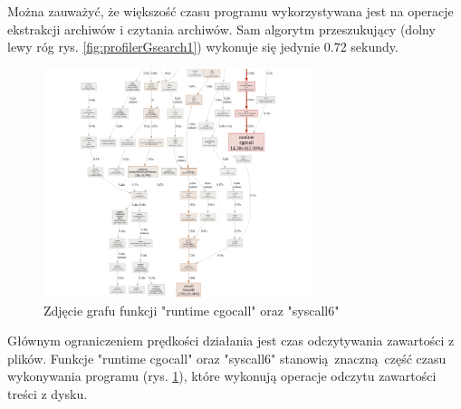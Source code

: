 Można zauważyć, że większość czasu programu wykorzystywana jest na operacje 
ekstrakcji archiwów i czytania archiwów. Sam algorytm przeszukujący (dolny lewy 
róg rys. \ref{fig:profilerGsearch1}) wykonuje się jedynie 0.72 sekundy.

\begin{figure}[h]
\centering
\includegraphics[width=0.7\textwidth]{./images/profiler2.png}
\caption{Zdjęcie grafu funkcji "runtime cgocall" oraz "syscall6"}
\label{fig:profilerGsearch2}
\end{figure}

Głównym ograniczeniem prędkości działania jest czas odczytywania zawartości z plików.
Funkcje "runtime cgocall" oraz "syscall6" stanowią znaczną część czasu
wykonywania programu (rys. \ref{fig:profilerGsearch2}), które wykonują operacje
odczytu zawartości treści z dysku.